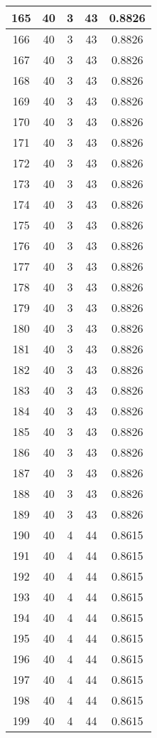 \documentclass[letterpaper, 12pt]{article}
\begin{document}
\begin{longtable}{|c|c|c|c|c|}
\hline
165 & 40 & 3 & 43 & 0.8826 \\
\hline
166 & 40 & 3 & 43 & 0.8826 \\
\hline
167 & 40 & 3 & 43 & 0.8826 \\
\hline
168 & 40 & 3 & 43 & 0.8826 \\
\hline
169 & 40 & 3 & 43 & 0.8826 \\
\hline
170 & 40 & 3 & 43 & 0.8826 \\
\hline
171 & 40 & 3 & 43 & 0.8826 \\
\hline
172 & 40 & 3 & 43 & 0.8826 \\
\hline
173 & 40 & 3 & 43 & 0.8826 \\
\hline
174 & 40 & 3 & 43 & 0.8826 \\
\hline
175 & 40 & 3 & 43 & 0.8826 \\
\hline
176 & 40 & 3 & 43 & 0.8826 \\
\hline
177 & 40 & 3 & 43 & 0.8826 \\
\hline
178 & 40 & 3 & 43 & 0.8826 \\
\hline
179 & 40 & 3 & 43 & 0.8826 \\
\hline
180 & 40 & 3 & 43 & 0.8826 \\
\hline
181 & 40 & 3 & 43 & 0.8826 \\
\hline
182 & 40 & 3 & 43 & 0.8826 \\
\hline
183 & 40 & 3 & 43 & 0.8826 \\
\hline
184 & 40 & 3 & 43 & 0.8826 \\
\hline
185 & 40 & 3 & 43 & 0.8826 \\
\hline
186 & 40 & 3 & 43 & 0.8826 \\
\hline
187 & 40 & 3 & 43 & 0.8826 \\
\hline
188 & 40 & 3 & 43 & 0.8826 \\
\hline
189 & 40 & 3 & 43 & 0.8826 \\
\hline
190 & 40 & 4 & 44 & 0.8615 \\
\hline
191 & 40 & 4 & 44 & 0.8615 \\
\hline
192 & 40 & 4 & 44 & 0.8615 \\
\hline
193 & 40 & 4 & 44 & 0.8615 \\
\hline
194 & 40 & 4 & 44 & 0.8615 \\
\hline
195 & 40 & 4 & 44 & 0.8615 \\
\hline
196 & 40 & 4 & 44 & 0.8615 \\
\hline
197 & 40 & 4 & 44 & 0.8615 \\
\hline
198 & 40 & 4 & 44 & 0.8615 \\
\hline
199 & 40 & 4 & 44 & 0.8615 \\
\hline
\end{longtable}
\end{document}
